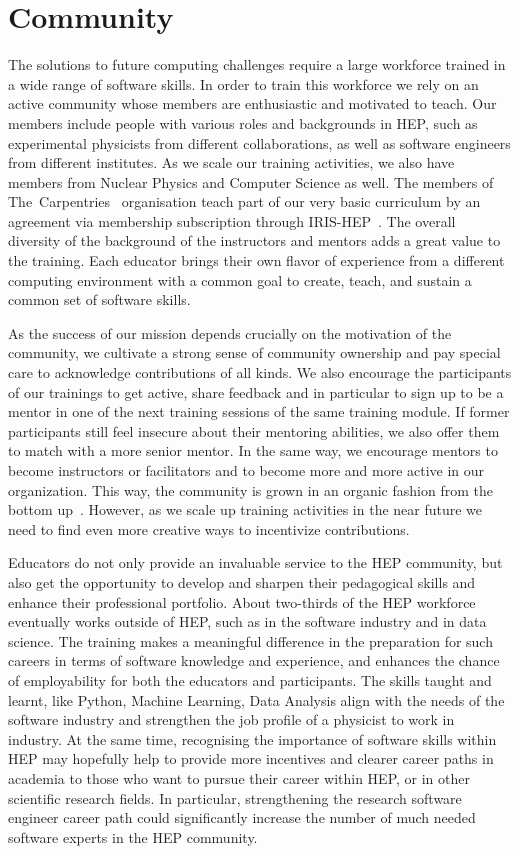 \documentclass[twocolumn]{svjour3}          %
\begin{document}
\section{Community}\label{sec:Community}
%
The solutions to future computing challenges require a large workforce trained in a wide range of software skills. In order to train this workforce we rely on an active community whose members are enthusiastic and motivated to teach. Our members include people with various roles and backgrounds in HEP, such as experimental physicists from different collaborations, as well as software engineers from different institutes. As we scale our training activities, we also have members from Nuclear Physics and Computer Science as well. The members of The~Carpentries~\cite{carpentries} organisation teach part of our very basic curriculum by an agreement via membership subscription through IRIS-HEP~\cite{iris-hep}. The overall diversity of the background of the instructors and mentors adds a great value to the training. Each educator brings their own flavor of experience from a different computing environment with a common goal to create, teach, and sustain a common set of software skills. 

As the success of our mission depends crucially on the motivation of the community, we cultivate a strong sense of community ownership and pay special care to acknowledge contributions of all kinds. We also encourage the participants of our trainings to get active, share feedback and in particular to sign up to be a mentor in one of the next training sessions of the same training module. If former participants still feel insecure about their mentoring abilities, we also offer them to match with a more senior mentor. In the same way, we encourage mentors to become instructors or facilitators and to become more and more active in our organization. This way, the community is grown in an organic fashion from the bottom up~\cite{hsf-community-building}. However, as we scale up training activities in the near future we need to find even more creative ways to incentivize contributions. 

Educators do not only provide an invaluable service to the HEP community, but also get the opportunity to develop and sharpen their pedagogical skills and enhance their professional portfolio. About two-thirds of the HEP workforce eventually works outside of HEP, such as in the software industry and in data science. The training makes a meaningful difference in the preparation for such careers in terms of software knowledge and experience, and enhances the chance of employability for both the educators and participants. The skills taught and learnt, like Python, Machine Learning, Data Analysis align with the needs of the software industry and strengthen the job profile of a physicist to work in industry. At the same time, recognising the importance of software skills within HEP may hopefully help to provide more incentives and clearer career paths in academia to those who want to pursue their career within HEP, or in other scientific research fields. In particular, strengthening the research software engineer career path could significantly increase the number of much needed software experts in the HEP community. 
\end{document}
